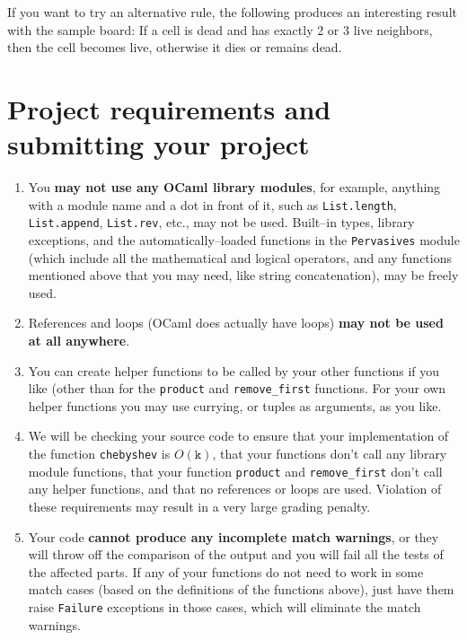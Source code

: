 \documentclass[11pt]{article}
\begin{document}
    If you want to try an alternative rule, the following produces an
  interesting result with the sample board: If a cell is dead and has
  exactly 2 or 3 live neighbors, then the cell becomes live, otherwise it
  dies or remains dead.

  \section{Project requirements and submitting your
           project\label{section:requirements}}

    \begin{enumerate}

      \addtolength{\itemsep}{-.5mm}

      \item You \textbf{may not use any OCaml library modules}, for
            example, anything with a module name and a dot in front of it,
            such as \texttt{List.length}, \texttt{List.append},
            \texttt{List.rev}, etc., may not be used.  Built--in types,
            library exceptions, and the automatically--loaded functions
            in the \texttt{Pervasives}  module (which include all the
            mathematical and logical operators, and any functions mentioned
            above that you may need, like string concatenation), may be
            freely used.

      \item References and loops (OCaml does actually have loops)
            \textbf{may not be used at all anywhere}.

      \item You can create helper functions to be called by your other
            functions if you like (other than for the \texttt{product} and
            \texttt{remove\_first} functions.  For your own helper functions
            you may use currying, or tuples as arguments, as you like.

      \item We will be checking your source code to ensure that your
            implementation of the function \texttt{chebyshev} is
            $O(\texttt{k})$, that your functions don't call any library
            module functions, that your function \texttt{product} and
            \texttt{remove\_first} don't call any helper functions, and that
            no references or loops are used.  Violation of these
            requirements may result in a very large grading penalty.

      \item Your code \textbf{cannot produce any incomplete match warnings},
            or they will throw off the comparison of the output and you will
            fail all the tests of the affected parts.  If any of your
            functions do not need to work in some match cases (based on the
            definitions of the functions above), just have them raise
            \texttt{Failure} exceptions in those cases, which will eliminate
            the match warnings.


\end{enumerate}
\end{document}
